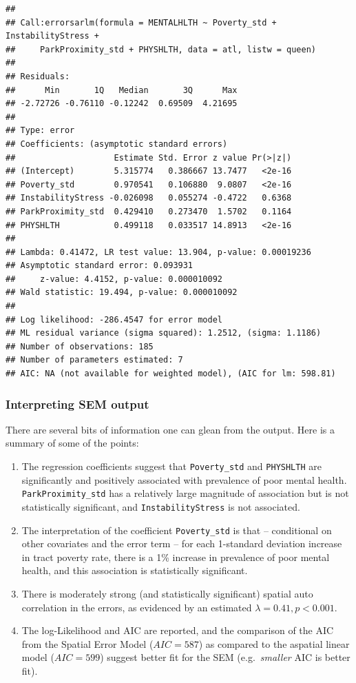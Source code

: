 \documentclass[
]{book}
\providecommand{\tightlist}{%
  \setlength{\itemsep}{0pt}\setlength{\parskip}{0pt}}
\begin{document}
\begin{verbatim}
## 
## Call:errorsarlm(formula = MENTALHLTH ~ Poverty_std + InstabilityStress + 
##     ParkProximity_std + PHYSHLTH, data = atl, listw = queen)
## 
## Residuals:
##      Min       1Q   Median       3Q      Max 
## -2.72726 -0.76110 -0.12242  0.69509  4.21695 
## 
## Type: error 
## Coefficients: (asymptotic standard errors) 
##                    Estimate Std. Error z value Pr(>|z|)
## (Intercept)        5.315774   0.386667 13.7477   <2e-16
## Poverty_std        0.970541   0.106880  9.0807   <2e-16
## InstabilityStress -0.026098   0.055274 -0.4722   0.6368
## ParkProximity_std  0.429410   0.273470  1.5702   0.1164
## PHYSHLTH           0.499118   0.033517 14.8913   <2e-16
## 
## Lambda: 0.41472, LR test value: 13.904, p-value: 0.00019236
## Asymptotic standard error: 0.093931
##     z-value: 4.4152, p-value: 0.000010092
## Wald statistic: 19.494, p-value: 0.000010092
## 
## Log likelihood: -286.4547 for error model
## ML residual variance (sigma squared): 1.2512, (sigma: 1.1186)
## Number of observations: 185 
## Number of parameters estimated: 7 
## AIC: NA (not available for weighted model), (AIC for lm: 598.81)
\end{verbatim}

\hypertarget{interpreting-sem-output}{%
\subsubsection{Interpreting SEM output}\label{interpreting-sem-output}}

There are several bits of information one can glean from the output. Here is a summary of some of the points:

\begin{enumerate}
\def\labelenumi{\arabic{enumi}.}
\tightlist
\item
  The regression coefficients suggest that \texttt{Poverty\_std} and \texttt{PHYSHLTH} are significantly and positively associated with prevalence of poor mental health. \texttt{ParkProximity\_std} has a relatively large magnitude of association but is not statistically significant, and \texttt{InstabilityStress} is not associated.
\item
  The interpretation of the coefficient \texttt{Poverty\_std} is that -- conditional on other covariates and the error term -- for each 1-standard deviation increase in tract poverty rate, there is a 1\% increase in prevalence of poor mental health, and this association is statistically significant.
\item
  There is moderately strong (and statistically significant) spatial auto correlation in the errors, as evidenced by an estimated \(\lambda=0.41, p < 0.001\).
\item
  The log-Likelihood and AIC are reported, and the comparison of the AIC from the Spatial Error Model (\(AIC=587\)) as compared to the aspatial linear model (\(AIC=599\)) suggest better fit for the SEM (e.g.~\emph{smaller} AIC is better fit).
\end{enumerate}
\end{document}
